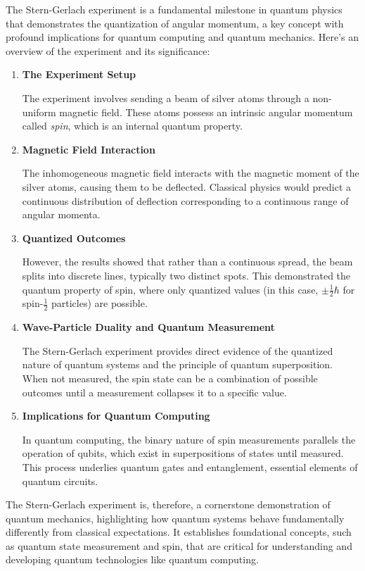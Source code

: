 \begin{airesult}
The Stern-Gerlach experiment is a fundamental milestone in quantum physics that demonstrates the
quantization of angular momentum, a key concept with profound implications for quantum computing and
quantum mechanics. Here's an overview of the experiment and its significance:

\vsp

\begin{enumerate}
\item \textbf{The Experiment Setup}

The experiment involves sending a beam of silver atoms through a non-uniform magnetic field. These
atoms possess an intrinsic angular momentum called \textit{spin}, which is an internal quantum
property.

\item \textbf{Magnetic Field Interaction}

The inhomogeneous magnetic field interacts with the magnetic moment of the silver atoms, causing
them to be deflected. Classical physics would predict a continuous distribution of deflection
corresponding to a continuous range of angular momenta.

\item \textbf{Quantized Outcomes}

However, the results showed that rather than a continuous spread, the beam splits into discrete
lines, typically two distinct spots. This demonstrated the quantum property of spin, where only
quantized values (in this case, \(\pm \frac{1}{2} \hbar\) for spin-\( \frac{1}{2} \) particles) are
possible.

\item \textbf{Wave-Particle Duality and Quantum Measurement}

The Stern-Gerlach experiment provides direct evidence of the quantized nature of quantum systems and
the principle of quantum superposition. When not measured, the spin state can be a combination of
possible outcomes until a measurement collapses it to a specific value.

\item \textbf{Implications for Quantum Computing}

In quantum computing, the binary nature of spin measurements parallels the operation of qubits,
which exist in superpositions of states until measured. This process underlies quantum gates and
entanglement, essential elements of quantum circuits.

\end{enumerate}

\vsp

The Stern-Gerlach experiment is, therefore, a cornerstone demonstration of quantum mechanics,
highlighting how quantum systems behave fundamentally differently from classical expectations. It
establishes foundational concepts, such as quantum state measurement and spin, that are critical for
understanding and developing quantum technologies like quantum computing.
\end{airesult}


